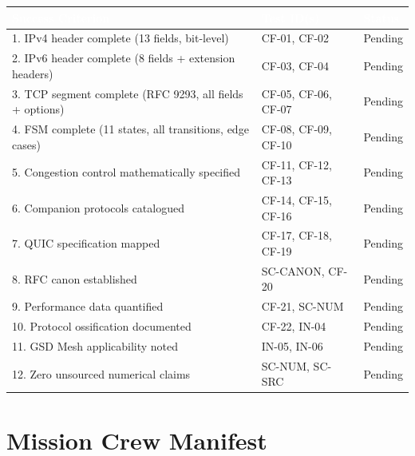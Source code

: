 \documentclass[11pt,letterpaper]{article}
\newcommand{\tableheader}[1]{\textbf{\sffamily\textcolor{white}{#1}}}
\begin{document}
\begin{center}
\begin{tabularx}{\textwidth}{XL{4cm}C{1.8cm}}
\toprule
{}
\tableheader{Success Criterion} & \tableheader{Test ID(s)} & \tableheader{Status} \\
. IPv4 header complete (13 fields, bit-level) & CF-01, CF-02 & Pending \\
2. IPv6 header complete (8 fields + extension headers) & CF-03, CF-04 & Pending \\
3. TCP segment complete (RFC 9293, all fields + options) & CF-05, CF-06, CF-07 & Pending \\
4. FSM complete (11 states, all transitions, edge cases) & CF-08, CF-09, CF-10 & Pending \\
5. Congestion control mathematically specified & CF-11, CF-12, CF-13 & Pending \\
6. Companion protocols catalogued & CF-14, CF-15, CF-16 & Pending \\
7. QUIC specification mapped & CF-17, CF-18, CF-19 & Pending \\
8. RFC canon established & SC-CANON, CF-20 & Pending \\
9. Performance data quantified & CF-21, SC-NUM & Pending \\
10. Protocol ossification documented & CF-22, IN-04 & Pending \\
11. GSD Mesh applicability noted & IN-05, IN-06 & Pending \\
12. Zero unsourced numerical claims & SC-NUM, SC-SRC & Pending \\
\bottomrule
\end{tabularx}
\end{center}

\section{Mission Crew Manifest}
\end{document}
